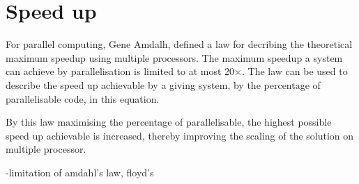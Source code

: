 \section{Speed up}
\label{sup}
  For parallel computing, Gene Amdalh, defined a law for decribing the theoretical maximum speedup using multiple processors. The maximum speedup a system can achieve by parallelisation is limited to at most 20×.
  The law can be used to describe the speed up achievable by a giving system, by the percentage of parallelisable code, in this equation.

  By this law maximising the percentage of parallelisable, the highest possible speed up achievable is increased, thereby improving the scaling of the solution on multiple processor.

  -limitation of amdahl's law, floyd's
